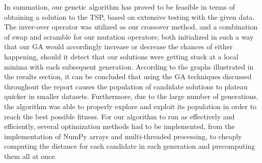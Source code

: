 In summation, our genetic algorithm has proved to be feasible 
in terms of obtaining a solution to the TSP, based on extensive 
testing with the given data. The inver-over operator was utilized 
as our crossover method, and a combination of swap and scramble 
for our mutation operators; both initialized in such a way that 
our GA would accordingly increase or decrease the chances of 
either happening, should it detect that our solutions were 
getting stuck at a local minima with each subsequent generation.
According to the graphs illustrated in the results section, 
it can be concluded that using the GA techniques discussed 
throughout the report causes the population of candidate 
solutions to plateau quicker in smaller datasets. 
Furthermore, due to the large number of generations, 
the algorithm was able to properly explore and exploit 
its population in order to reach the best possible fitness.
For our algorithm to run as effectively and efficiently, 
several optimization methods had to be implemented, 
from the implementation of NumPy arrays and multi-threaded processing, 
to cheaply computing the distance for each candidate in each 
generation and precomputing them all at once.

